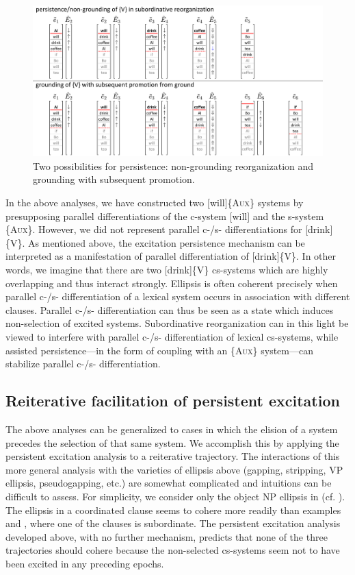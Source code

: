   
\begin{figure}
\includegraphics[width=\textwidth]{figures/Tilsen-img149.png}
\caption{Two possibilities for persistence: non-grounding reorganization and grounding with subsequent promotion.}
\label{fig:7:5}
\end{figure}
 

  In the above analyses, we have constructed two [will]\{A\textsc{ux}\} systems by presupposing parallel differentiations of the c-system [will] and the s-system \{A\textsc{ux}\}. However, we did not represent parallel c-/s- differentiations for [drink]\{V\}. As mentioned above, the excitation persistence mechanism can be interpreted as a manifestation of parallel differentiation of [drink]\{V\}. In other words, we imagine that there are two [drink]\{V\} cs-systems which are highly overlapping and thus interact strongly. Ellipsis is often coherent precisely when parallel c-/s- differentiation of a lexical system occurs in association with different clauses. Parallel c-/s- differentiation can thus be seen as a state which induces non-selection of excited systems. Subordinative reorganization can in this light be viewed to interfere with parallel c-/s- differentiation of lexical cs-systems, while assisted persistence—in the form of coupling with an \{A\textsc{ux}\} system—can stabilize parallel c-/s- differentiation.

\subsection{Reiterative facilitation of persistent excitation}

The above analyses can be generalized to cases in which the elision of a system precedes the selection of that same system. We accomplish this by applying the persistent excitation analysis to a reiterative trajectory. The interactions of this more general analysis with the varieties of ellipsis above (gapping, stripping, VP ellipsis, pseudogapping, etc.) are somewhat complicated and intuitions can be difficult to assess. For simplicity, we consider only the object NP ellipsis in  (cf. \citealt{Wilder1997}). The ellipsis in a coordinated clause  seems to cohere more readily than examples  and , where one of the clauses is subordinate. The persistent excitation analysis developed above, with no further mechanism, predicts that none of the three trajectories should cohere because the non-selected cs-systems seem not to have been excited in any preceding epochs.

